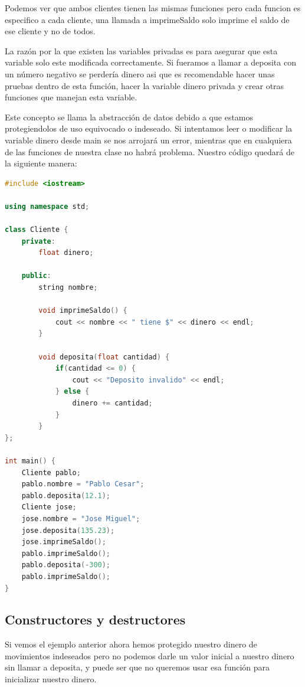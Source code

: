\documentclass{article}
\begin{document}
Podemos ver que ambos clientes tienen las mismas funciones pero cada funcion es especifico a cada cliente, una llamada a imprimeSaldo solo imprime el saldo de ese cliente y no de todos.

La razón por la que existen las variables privadas es para asegurar que esta variable solo este modificada correctamente. Si fueramos a llamar a deposita con un número negativo se perdería dinero asi que es recomendable hacer unas pruebas dentro de esta función, hacer la variable dinero privada y crear otras funciones que manejan esta variable.

Este concepto se llama la abstracción de datos debido a que estamos protegiendolos de uso equivocado o indeseado. Si intentamos leer o modificar la variable dinero desde main se nos arrojará un error, mientras que en cualquiera de las funciones de nuestra clase no habrá problema. Nuestro código quedará de la siguiente manera:

\begin{lstlisting}[language=C++, caption=Abstracción de datos]
#include <iostream>

using namespace std;

class Cliente {
    private:
        float dinero;

    public:
        string nombre;

        void imprimeSaldo() {
            cout << nombre << " tiene $" << dinero << endl;
        }

        void deposita(float cantidad) {
            if(cantidad <= 0) {
                cout << "Deposito invalido" << endl;
            } else {
                dinero += cantidad;
            }
        }
};

int main() {
    Cliente pablo;
    pablo.nombre = "Pablo Cesar";
    pablo.deposita(12.1);
    Cliente jose;
    jose.nombre = "Jose Miguel";
    jose.deposita(135.23);
    jose.imprimeSaldo();
    pablo.imprimeSaldo();
    pablo.deposita(-300);
    pablo.imprimeSaldo();
}
\end{lstlisting}

\subsection{Constructores y destructores}

Si vemos el ejemplo anterior ahora hemos protegido nuestro dinero de movimientos indeseados pero no podemos darle un valor inicial a nuestro dinero sin llamar a deposita, y puede ser que no queremos usar esa función para inicializar nuestro dinero.
\end{document}

